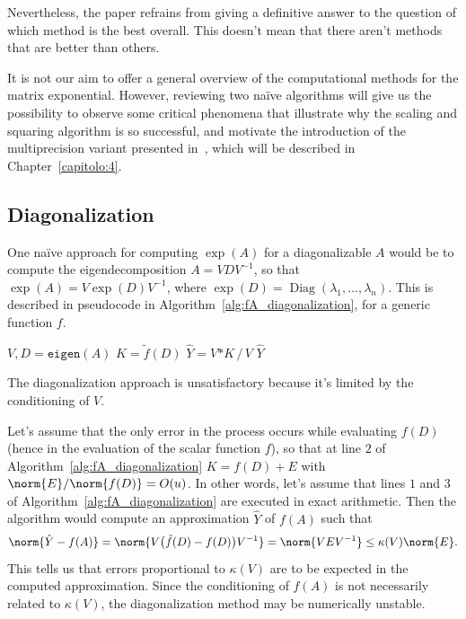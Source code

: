 Nevertheless, the paper refrains from giving a definitive answer to the question of which method is the best overall. This doesn't mean that there aren't methods that are better than others.

It is not our aim to offer a general overview of the computational methods for the matrix exponential.
However, reviewing two na\"ive algorithms will give us the possibility to observe some critical phenomena that 
illustrate why the scaling and squaring algorithm is so successful, and motivate the introduction of the multiprecision variant presented in~\cite{higham:hf19_mpexpm}, which will be described in Chapter~\ref{capitolo:4}.

\subsection{Diagonalization}\label{subs:diagonalization}
One na\"ive approach for computing $\exp(A)$ for a diagonalizable $A$ would be to compute the eigendecomposition $A=VDV^{-1}$, so that $\exp(A)=V\exp(D)V^{-1}$, where $\exp(D)=\operatorname{Diag}(\lambda_1,\dots,\lambda_n)$. This is described in pseudocode in Algorithm~\ref{alg:fA_diagonalization}, for a generic function $f$.

\begin{algorithm}[H]
	\centering
	\caption{\emph{Computing $f(A)$ by diagonalization}}
	\label{alg:fA_diagonalization}
	\begin{algorithmic}[1]
		\State $V,D = \mathtt{eigen}(A)$
		\State $K=\tilde{f}(D)$
		\State $\hat{Y}=V\mathtt{*}K\,/\,V$
		\State \Return $\hat{Y}$
	\end{algorithmic}
\end{algorithm}

The diagonalization approach is unsatisfactory because it's limited by the conditioning of $V$. 

Let's assume that the only error in the process occurs while evaluating $f(D)$ (hence in the evaluation of the scalar function $f$), so that at line $2$ of Algorithm~\ref{alg:fA_diagonalization} $K=f(D)+E$ with $\norm{E}/\norm{f(D)}=O(u)$. In other words, let's assume that lines $1$ and $3$ of Algorithm~\ref{alg:fA_diagonalization} are executed in exact arithmetic. Then the algorithm would compute an approximation $\hat{Y}$ of $f(A)$ such that 
\[
	\norm{\hat{Y}-f(A)}=\norm{V\big(\tilde{f}(D)-f(D)\big)V^{-1}}=\norm{VEV^{-1}}\le\kappa(V)\norm{E}.
\]
This tells us that errors proportional to $\kappa(V)$ are to be expected in the computed approximation.
Since the conditioning of $f(A)$ is not necessarily related to $\kappa(V)$, the diagonalization method may be numerically unstable.

